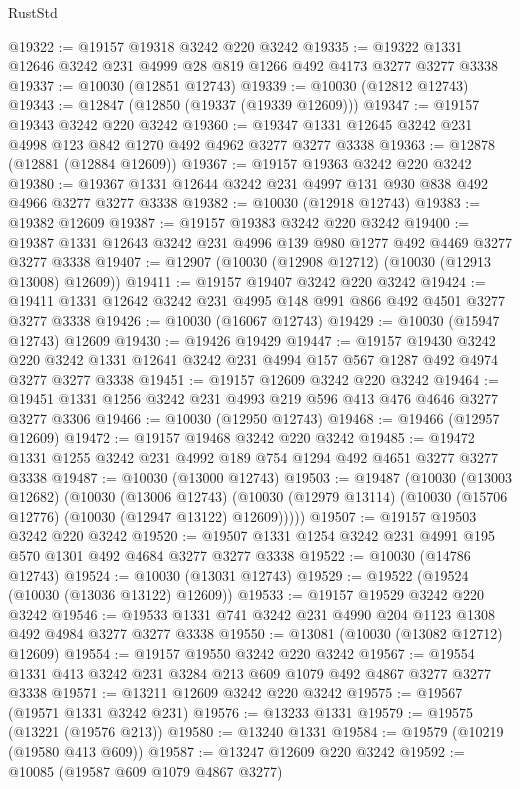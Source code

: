 \begin{lexlean}{RustStd}
\begin{coremodule}
@19322 := @19157 @19318 @3242 @220 @3242
@19335 := @19322 @1331 @12646 @3242 @231 @4999 @28 @819 @1266 @492 @4173 @3277 @3277 @3338
@19337 := @10030 (@12851 @12743)
@19339 := @10030 (@12812 @12743)
@19343 := @12847 (@12850 (@19337 (@19339 @12609)))
@19347 := @19157 @19343 @3242 @220 @3242
@19360 := @19347 @1331 @12645 @3242 @231 @4998 @123 @842 @1270 @492 @4962 @3277 @3277 @3338
@19363 := @12878 (@12881 (@12884 @12609))
@19367 := @19157 @19363 @3242 @220 @3242
@19380 := @19367 @1331 @12644 @3242 @231 @4997 @131 @930 @838 @492 @4966 @3277 @3277 @3338
@19382 := @10030 (@12918 @12743)
@19383 := @19382 @12609
@19387 := @19157 @19383 @3242 @220 @3242
@19400 := @19387 @1331 @12643 @3242 @231 @4996 @139 @980 @1277 @492 @4469 @3277 @3277 @3338
@19407 := @12907 (@10030 (@12908 @12712) (@10030 (@12913 @13008) @12609))
@19411 := @19157 @19407 @3242 @220 @3242
@19424 := @19411 @1331 @12642 @3242 @231 @4995 @148 @991 @866 @492 @4501 @3277 @3277 @3338
@19426 := @10030 (@16067 @12743)
@19429 := @10030 (@15947 @12743) @12609
@19430 := @19426 @19429
@19447 := @19157
    @19430
    @3242
    @220
    @3242
    @1331
    @12641
    @3242
    @231
    @4994
    @157
    @567
    @1287
    @492
    @4974
    @3277
    @3277
    @3338
@19451 := @19157 @12609 @3242 @220 @3242
@19464 := @19451 @1331 @1256 @3242 @231 @4993 @219 @596 @413 @476 @4646 @3277 @3277 @3306
@19466 := @10030 (@12950 @12743)
@19468 := @19466 (@12957 @12609)
@19472 := @19157 @19468 @3242 @220 @3242
@19485 := @19472 @1331 @1255 @3242 @231 @4992 @189 @754 @1294 @492 @4651 @3277 @3277 @3338
@19487 := @10030 (@13000 @12743)
@19503 := @19487
    (@10030
      (@13003 @12682)
      (@10030
        (@13006 @12743)
        (@10030 (@12979 @13114) (@10030 (@15706 @12776) (@10030 (@12947 @13122) @12609)))))
@19507 := @19157 @19503 @3242 @220 @3242
@19520 := @19507 @1331 @1254 @3242 @231 @4991 @195 @570 @1301 @492 @4684 @3277 @3277 @3338
@19522 := @10030 (@14786 @12743)
@19524 := @10030 (@13031 @12743)
@19529 := @19522 (@19524 (@10030 (@13036 @13122) @12609))
@19533 := @19157 @19529 @3242 @220 @3242
@19546 := @19533 @1331 @741 @3242 @231 @4990 @204 @1123 @1308 @492 @4984 @3277 @3277 @3338
@19550 := @13081 (@10030 (@13082 @12712) @12609)
@19554 := @19157 @19550 @3242 @220 @3242
@19567 := @19554 @1331 @413 @3242 @231 @3284 @213 @609 @1079 @492 @4867 @3277 @3277 @3338
@19571 := @13211 @12609 @3242 @220 @3242
@19575 := @19567 (@19571 @1331 @3242 @231)
@19576 := @13233 @1331
@19579 := @19575 (@13221 (@19576 @213))
@19580 := @13240 @1331
@19584 := @19579 (@10219 (@19580 @413 @609))
@19587 := @13247 @12609 @220 @3242
@19592 := @10085 (@19587 @609 @1079 @4867 @3277)

\end{coremodule}
\end{lexlean}
